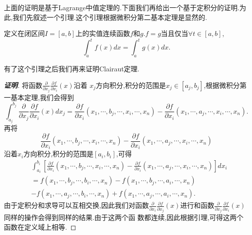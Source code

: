 \documentclass[a4paper]{article}
\newcommand{\pa}{\partial} \newcommand{\Om}{\Omega}
\begin{document}
上面的证明是基于Lagrange中值定理的.下面我们再给出一个基于定积分的证明.为
此,我们先叙述一个引理.这个引理根据微积分第二基本定理是显然的.
\begin{lemma}
 定义在闭区间$I=[a,b]$上的实值连续函数$f$和$g$.$f=g$当且仅当$\forall
 t\in [a,b]$,
$$
\int_a^tf(x)dx=\int_a^tg(x)dx.
$$
\end{lemma}
有了这个引理之后我们再来证明Clairaut定理.
\begin{proof}[\textbf{证明}]
将函数$\frac{\pa }{\pa x_j}\frac{\pa f}{\pa x_i}(x)$沿着
$x_j$方向积分,积分的范围是$x_j\in [a_j,b_j]$,根据微积分第一基本定理,我们会得到
\begin{equation}\label{eq:4}
\int_{a_j}^{b_j}\frac{\pa}{\pa x_j}\frac{\pa f}{\pa
  x_i}(x)dx_j=\frac{\pa f}{\pa
  x_i}(x_1,\cdots,b_j,\cdots,x_i,\cdots,x_n)-\frac{\pa f}{\pa x_i}(x_1,\cdots,a_j,\cdots,x_i,\cdots,x_n).
\end{equation}
再将
$$
\frac{\pa f}{\pa
  x_i}(x_1,\cdots,b_j,\cdots,x_i,\cdots,x_n)-\frac{\pa f}{\pa x_i}(x_1,\cdots,a_j,\cdots,x_i,\cdots,x_n)
$$
沿着$x_i$方向积分,积分的范围是$[a_i,b_i]$,可得
\begin{align*}
&\int_{a_{i}}^{b_{i}}\left[\frac{\pa f}{\pa
  x_i}(x_1,\cdots,b_j,\cdots,x_i,\cdots,x_n)-\frac{\pa f}{\pa x_i}(x_1,\cdots,a_j,\cdots,x_i,\cdots,x_n)\right]dx_i\\&=f(x_1,\cdots,b_j,\cdots,b_i,\cdots,x_n)-f(x_1,\cdots,b_j,\cdots,a_i,\cdots,x_n)\\&-f(x_1,\cdots,a_j,\cdots,b_i,\cdots,x_n)+f(x_1,\cdots,a_j,\cdots,a_i,\cdots,x_n).
\end{align*}
由于定积分和求导可以互相交换,因此我们对函数$\frac{\pa }{\pa
  x_i}\frac{\pa f}{\pa x_j}(x)$进行和函数$\frac{\pa }{\pa
  x_j}\frac{\pa f}{\pa x_i}(x)$同样的操作会得到同样的结果.由于这两个函
数都连续,因此根据引理,可得这两个函数在定义域上相等.
\end{proof}
\end{document}
